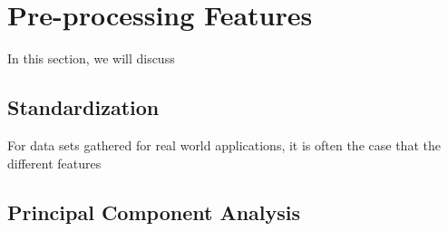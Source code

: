 \section{Pre-processing Features}\label{sec:Pre-processing Features Theory}
In this section, we will discuss 

\subsection{Standardization}\label{sec:Standardization}
For data sets gathered for real world applications, it is often the case that the different features 

\subsection{Principal Component Analysis}\label{sec:Principal Component Analysis}
